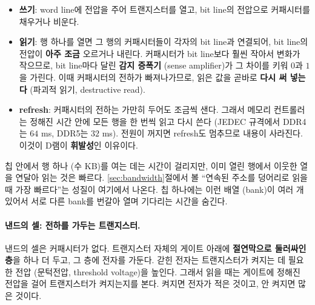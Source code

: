 \documentclass[11pt,a4paper]{article}
\begin{document}
\begin{itemize}[leftmargin=1.5em]
\item \textbf{쓰기}: word line에 전압을 주어 트랜지스터를 열고, bit line의 전압으로 커패시터를 채우거나 비운다.
\item \textbf{읽기}: 행 하나를 열면 그 행의 커패시터들이 각자의 bit line과 연결되어, bit line의 전압이 \textbf{아주 조금} 오르거나 내린다.
커패시터가 bit line보다 훨씬 작아서 변화가 작으므로, bit line마다 달린 \textbf{감지 증폭기} (sense amplifier)가 그 차이를 키워 $0$과 $1$을 가린다.
이때 커패시터의 전하가 빠져나가므로, 읽은 값을 곧바로 \textbf{다시 써 넣는다} (파괴적 읽기, destructive read).
\item \textbf{refresh}: 커패시터의 전하는 가만히 두어도 조금씩 샌다.
그래서 메모리 컨트롤러는 정해진 시간 안에 모든 행을 한 번씩 읽고 다시 쓴다 (JEDEC 규격에서 DDR4는 $64$ ms, DDR5는 $32$ ms).
전원이 꺼지면 refresh도 멈추므로 내용이 사라진다. 이것이 D램이 \textbf{휘발성}인 이유이다.
\end{itemize}

칩 안에서 행 하나 (수 KB)를 여는 데는 시간이 걸리지만, 이미 열린 행에서 이웃한 열을 연달아 읽는 것은 빠르다.
\ref{sec:bandwidth}절에서 볼 ``연속된 주소를 덩어리로 읽을 때 가장 빠르다''는 성질이 여기에서 나온다.
칩 하나에는 이런 배열 (bank)이 여러 개 있어서 서로 다른 bank를 번갈아 열며 기다리는 시간을 숨긴다.

\paragraph{낸드의 셀: 전하를 가두는 트랜지스터.}
낸드의 셀은 커패시터가 없다. 트랜지스터 자체의 게이트 아래에 \textbf{절연막으로 둘러싸인 층}을 하나 더 두고, 그 층에 전자를 가둔다.
갇힌 전자는 트랜지스터가 켜지는 데 필요한 전압 (문턱전압, threshold voltage)을 높인다.
그래서 읽을 때는 게이트에 정해진 전압을 걸어 트랜지스터가 켜지는지를 본다. 켜지면 전자가 적은 것이고, 안 켜지면 많은 것이다.
\end{document}

